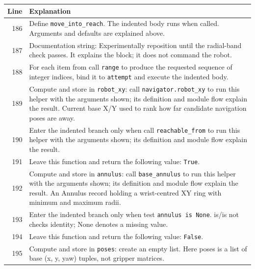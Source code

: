 \documentclass[11pt,a4paper]{book}
\begin{document}
\begin{longtable}{r p{}}

\textbf{Line} & \textbf{Explanation} \\ \hline \endhead

186 & Define \texttt{move\_into\_reach}. The indented body runs when called. Arguments and defaults are explained above. \\

187 & Documentation string: Experimentally reposition until the radial-band check passes. It explains the block; it does not command the robot. \\

188 & For each item from call \texttt{range} to produce the requested sequence of integer indices, bind it to \texttt{attempt} and execute the indented body. \\

189 & Compute and store in \texttt{robot\_xy}: call \texttt{navigator.robot\_xy} to run this helper with the arguments shown; its definition and module flow explain the result. Current base X/Y used to rank how far candidate navigation poses are away. \\

190 & Enter the indented branch only when call \texttt{reachable\_from} to run this helper with the arguments shown; its definition and module flow explain the result. \\

191 & Leave this function and return the following value: \texttt{True}. \\

192 & Compute and store in \texttt{annulus}: call \texttt{base\_annulus} to run this helper with the arguments shown; its definition and module flow explain the result. An Annulus record holding a wrist-centred XY ring with minimum and maximum radii. \\

193 & Enter the indented branch only when test \texttt{annulus is None}. is/is not checks identity; None denotes a missing value. \\

194 & Leave this function and return the following value: \texttt{False}. \\

195 & Compute and store in \texttt{poses}: create an empty list. Here poses is a list of base (x, y, yaw) tuples, not gripper matrices. \\


\end{longtable}
\end{document}
